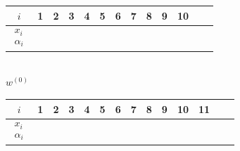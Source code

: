\documentclass[12pt]{article}
\def\red{\textcolor{red}}
\numberwithin{equation}{section}
\def\red{\textcolor{red}}
\theoremstyle{plain}
\def\green{\textcolor{blue}}
\begin{document}
	\begin{table}[h]
	\centering
	\begin{minipage}{0.45\textwidth}
		\centering
		\vspace{0.3em}
		\fontsize{11}{9}\selectfont  %
		\renewcommand{\arraystretch}{1.5}  %
		\setlength{\tabcolsep}{0.52em} %
		\begin{tabular}{c|cccccccccccc}
			$i$ & 1 & 2 & 3 & 4 & 5 & 6 & 7 & 8 & 9 & 10  \\
			\hline
			\multirow{2}{*}{$\begin{array}{c} x_i \\ \alpha_i \end{array}$} 
			& \makebox[0.7em][r]{1} & \makebox[0.7em][r]{1} & \makebox[0.7em][r]{1} & \makebox[0.7em][r]{2} & \makebox[0.7em][r]{2} & \makebox[0.7em][r]{2} & \makebox[0.7em][r]{3} & \makebox[0.7em][r]{3} & \makebox[0.7em][r]{4} & \makebox[0.7em][r]{4}  \\
			& \makebox[0.7em][r]{$_{\green{5}}\red{3}$} 
			& \makebox[0.7em][r]{$_{\green{6}}2$} 
			& \makebox[0.7em][r]{$_{\green{7}}2$} 
			& \makebox[0.7em][r]{$_{\green{4}}\red{4}$} 
			& \makebox[0.7em][r]{$_{\green{8}}1$} 
			& \makebox[0.7em][r]{$_{\green{3}}\red{4}$} 
			& \makebox[0.7em][r]{$_{\green{9}}3$} 
			& \makebox[0.7em][r]{$_{\green{10}}1$} 
			& \makebox[0.7em][r]{$_{\green{2}}2$} 
			& \makebox[0.7em][r]{$_{\green{1}}1$}
			& \makebox[0em][r]{$_{\green{0}}$} \\
		\end{tabular}
		\\[0.5em] %
		{\small $w^{(0)}$} %
	\end{minipage}
	\hfill
	\begin{minipage}{0.45\textwidth}
		\centering
		\vspace{0.3em}
		\fontsize{11}{9}\selectfont  %
		\renewcommand{\arraystretch}{1.5}  %
		\setlength{\tabcolsep}{0.4em} %
		\begin{tabular}{c|ccccccccccccc}
			$i$ & 1 & 2 & 3 & 4 & 5 & 6 & 7 & 8 & 9 & 10 & 11 \\
			\hline
			\multirow{2}{*}{$\begin{array}{c} x_i \\ \alpha_i \end{array}$} 
			& \makebox[0.7em][r]{1} & \makebox[0.7em][r]{1} & \makebox[0.7em][r]{1} & \makebox[0.7em][r]{2} & \makebox[0.7em][r]{2} & \makebox[0.7em][r]{2} & \makebox[0.7em][r]{3} & \makebox[0.7em][r]{3} & \makebox[0.7em][r]{4} & \makebox[0.7em][r]{4} & \makebox[0.7em][r]{5} \\

\end{tabular}
\end{minipage}
\end{table}
\end{document}
